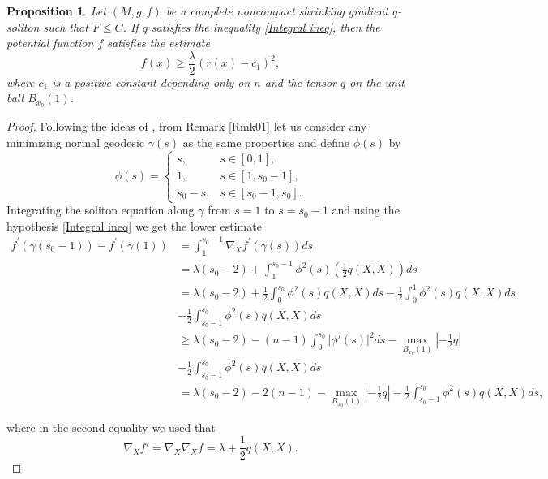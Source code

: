 \documentclass{amsart}
\theoremstyle{plain}
\newtheorem{proposition}[theorem]{\bf Proposition}
\numberwithin{equation}{section}
\begin{document}
\begin{proposition}\label{Prop03}
Let $(M,g,f)$ be a complete noncompact shrinking  gradient $q$-soliton such that $F\leq C$. If $q$ satisfies the inequality \eqref{Integral ineq}, then the potential function $f$ satisfies the estimate 
$$
f(x) \geq \frac{\lambda}{2}\left(r(x)-c_1\right)^2,$$
where $c_1$ is a positive constant depending only on $n$ and the tensor  $q$ on the unit ball $B_{x_0}(1)$.
\end{proposition}
\begin{proof}
Following the ideas of \cite{Cao-Zhou}, from Remark \ref{Rmk01} let us consider any minimizing normal geodesic $\gamma(s)$ as the same properties and define $\phi(s)$ by
\begin{equation*}
    \phi(s)= \left\lbrace\begin{matrix}
      s,  & s \in \left[0,1\right] ,     \\
      1,  & s\in \left[1,s_0-1\right],          \\
       s_0-s, &  s\in \left[s_0-1,s_0\right]  .        
    \end{matrix}\right.
\end{equation*}
Integrating the soliton equation along $\gamma$ from $s=1$ to $s=s_0-1$ and using the hypothesis \eqref{Integral ineq} we get the lower estimate \begin{align*}
f^{\prime}(\gamma(s_0-1))-f^{\prime}(\gamma(1)) &= \int_{1}^{s_0-1} \nabla_{X}f^{\prime}(\gamma(s))ds\\
 &=\lambda (s_{0}-2) + \int_{1}^{s_0-1} \phi^2(s)\left( \frac{1}{2}q(X,X) \right)ds\\
 &= \lambda (s_{0}-2) + \frac{1}{2}\int_{0}^{s_0} \phi^2(s)q(X,X)ds-\frac{1}{2}\int_0^1\phi^2(s)q(X,X)ds\\
 &- \frac{1}{2}\int_{s_0-1}^{s_0}\phi^2(s)q(X,X)ds\\
 &\geq \lambda(s_{0}-2) -(n-1)\int_{0}^{s_0} |\phi'(s)|^2ds-\max_{B_{x_0}(1)}\left|-\frac{1}{2}q\right|\\
 &- \frac{1}{2}\int_{s_0-1}^{s_0}\phi^2(s)q(X,X)ds\\
 &= \lambda(s_{0}-2) -2(n-1)-\max_{B_{x_0}(1)}\left|-\frac{1}{2}q\right|- \frac{1}{2}\int_{s_0-1}^{s_0}\phi^2(s)q(X,X)ds,\\
     &\\
\end{align*}
where in the second equality we used that
\begin{equation}\label{eq06}
    \nabla_Xf'=\nabla_X\nabla_X f=\lambda+\frac{1}{2}q(X,X).

\end{equation}
\end{proof}
\end{document}
